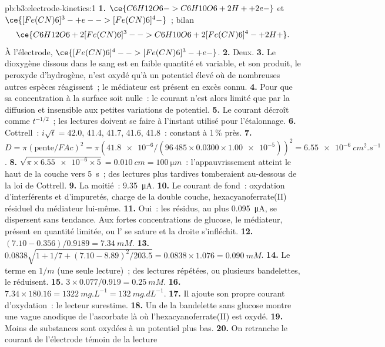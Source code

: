 \begin{solution}{pb:b3:electrode-kinetics:1}
\textbf{1.} $\ce{C6H12O6 -> C6H10O6 + 2 H+ + 2 e-}$ et $\ce{[Fe(CN)6]^3- + e- -> [Fe(CN)6]^4-}$~;
bilan
\[
  \ce{C6H12O6 + 2 [Fe(CN)6]^3- -> C6H10O6 + 2 [Fe(CN)6]^4- + 2 H+} .
\]
À l'électrode, $\ce{[Fe(CN)6]^4- -> [Fe(CN)6]^3- + e-}$.
\textbf{2.} Deux.
\textbf{3.} Le dioxygène dissous dans le sang est en faible quantité et
variable, et son produit, le peroxyde d'hydrogène, n'est oxydé qu'à un
potentiel élevé où de nombreuses autres espèces réagissent~; le
médiateur est présent en excès connu.
\textbf{4.} Pour que sa concentration à la surface soit nulle~: le
courant n'est alors limité que par la diffusion et insensible aux
petites variations de potentiel.
\textbf{5.} Le courant décroît comme $t^{-1/2}$~; les lectures doivent
se faire à l'instant utilisé pour l'étalonnage.
\textbf{6.} Cottrell~: $i\sqrt t = 42.0$, 41.4, 41.7, 41.6, 41.8~:
constant à 1\,\% près.
\textbf{7.} $D = \pi(\text{pente}/FAc)^2 = \pi(\num{41.8e-6}/(96\,485 \times 0.0300 \times \num{1.00e-5}))^2 = \qty{6.55e-6}{cm^2.s^{-1}}$.
\textbf{8.} $\sqrt{\pi \times \num{6.55e-6} \times 5} = \qty{0.010}{cm} = \qty{100}{\micro m}$~:
l'appauvrissement atteint le haut de la couche vers \qty{5}{s}~; des
lectures plus tardives tomberaient au-dessous de la loi de Cottrell.
\textbf{9.} La moitié~: \qty{9.35}{\micro A}.
\textbf{10.} Le courant de fond~: oxydation d'interférents et
d'impuretés, charge de la double couche, hexacyanoferrate(II) résiduel
du médiateur lui-même.
\textbf{11.} Oui~: les résidus, au plus \qty{0.095}{\micro A}, se
dispersent sans tendance. Aux fortes concentrations de glucose, le
médiateur, présent en quantité limitée, ou l' se sature et la
droite s'infléchit.
\textbf{12.} $(7.10 - 0.356)/0.9189 = \qty{7.34}{mM}$.
\textbf{13.} $0.0838\sqrt{1 + 1/7 + (7.10 - 8.89)^2/203.5} = 0.0838 \times 1.076 = \qty{0.090}{mM}$.
\textbf{14.} Le terme en $1/m$ (une seule lecture)~; des lectures
répétées, ou plusieurs bandelettes, le réduisent.
\textbf{15.} $3 \times 0.077/0.919 = \qty{0.25}{mM}$.
\textbf{16.} $7.34 \times 180.16 = \qty{1322}{mg.L^{-1}} = \qty{132}{mg.dL^{-1}}$.
\textbf{17.} Il ajoute son propre courant d'oxydation~: le lecteur
surestime.
\textbf{18.} Un  de la bandelette sans glucose montre une
vague anodique de l'ascorbate là où l'hexacyanoferrate(II) est oxydé.
\textbf{19.} Moins de substances sont oxydées à un potentiel plus bas.
\textbf{20.} On retranche le courant de l'électrode témoin de la lecture

\end{solution}

